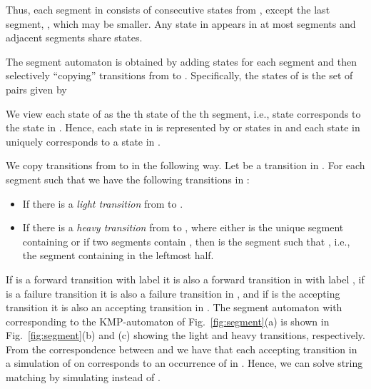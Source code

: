 \documentclass{article}
\begin{document}
Thus, each segment in  consists of  consecutive states from
, except the last segment, , which may be smaller. Any
state  in  appears in at most  segments and adjacent segments
share  states.


The segment automaton  is obtained by adding  states
for each segment  and then selectively ``copying''
transitions from  to . Specifically, the states of  is the
set of pairs given by
 
We view each state  of  as the th state of the th
segment, i.e., state  corresponds to the state  in
. Hence, each state in  is represented by  or  states in
 and each state in  uniquely corresponds to a state in .


We copy transitions from  to  in the following way. Let  be a transition in . For each segment  such that  we have the following transitions in :
\begin{itemize}
\item If  there is a \emph{light transition} from  to . 
\item If  there is a \emph{heavy transition} from  to , where either  is the unique segment containing  or if two segments contain , then  is the segment such that , i.e., the segment containing  in the leftmost half.
\end{itemize}
If  is a forward transition with label  it is
also a forward transition in  with label , if  is a
failure transition it is also a failure transition in , and if 
is the accepting transition it is also an accepting transition in .
The segment automaton with  corresponding to the KMP-automaton
of Fig.~\ref{fig:segment}(a) is shown in Fig.~\ref{fig:segment}(b) and
(c) showing the light and heavy transitions, respectively. From the
correspondence between  and  we have that each accepting
transition in a simulation of  on  corresponds to an occurrence
of  in . Hence, we can solve string matching by simulating 
instead of .
\end{document}
